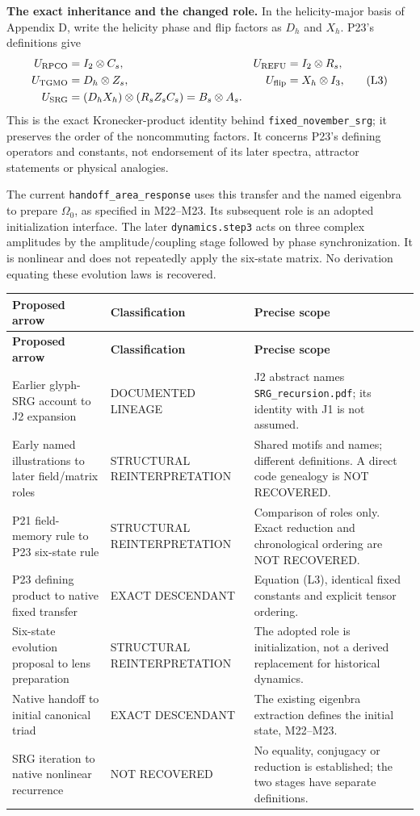 \documentclass[11pt,a4paper]{article}
\begin{document}
\textbf{The exact inheritance and the changed role.}
In the helicity-major basis of Appendix D, write the helicity phase and flip factors as \(D_h\) and \(X_h\). P23's definitions give
\[
\begin{aligned}
 U_{\rm RPCO}&=I_2\otimes C_s,&U_{\rm REFU}&=I_2\otimes R_s,\\
 U_{\rm TGMO}&=D_h\otimes Z_s,&U_{\rm flip}&=X_h\otimes I_3,\\
 U_{\rm SRG}&=(D_hX_h)\otimes(R_sZ_sC_s)=B_s\otimes A_s .
\end{aligned}
\tag{L3}\label{eq:L3}
\]
This is the exact Kronecker-product identity behind \texttt{fixed\_november\_srg}; it preserves the order of the noncommuting factors. It concerns P23's defining operators and constants, not endorsement of its later spectra, attractor statements or physical analogies.

The current \texttt{handoff\_area\_response} uses this transfer and the named eigenbra to prepare \(\Omega_0\), as specified in M22--M23. Its subsequent role is an adopted initialization interface. The later \texttt{dynamics.step3} acts on three complex amplitudes by the amplitude/coupling stage followed by phase synchronization. It is nonlinear and does not repeatedly apply the six-state matrix. No derivation equating these evolution laws is recovered.

\begingroup\small\setlength{\LTpre}{5pt}\setlength{\LTpost}{7pt}
\begin{longtable}{@{}p{}p{}p{}@{}}
\toprule
\textbf{Proposed arrow} & \textbf{Classification} & \textbf{Precise scope}\\ \midrule
\endfirsthead
\textbf{Proposed arrow} & \textbf{Classification} & \textbf{Precise scope}\\ \midrule
\endhead
\bottomrule\endfoot
Earlier glyph-SRG account to J2 expansion & DOCUMENTED LINEAGE & J2 abstract names \texttt{SRG\_recursion.pdf}; its identity with J1 is not assumed.\\[5pt]
Early named illustrations to later field/matrix roles & STRUCTURAL REINTERPRETATION & Shared motifs and names; different definitions. A direct code genealogy is NOT RECOVERED.\\[5pt]
P21 field-memory rule to P23 six-state rule & STRUCTURAL REINTERPRETATION & Comparison of roles only. Exact reduction and chronological ordering are NOT RECOVERED.\\[5pt]
P23 defining product to native fixed transfer & EXACT DESCENDANT & Equation (L3), identical fixed constants and explicit tensor ordering.\\[5pt]
Six-state evolution proposal to lens preparation & STRUCTURAL REINTERPRETATION & The adopted role is initialization, not a derived replacement for historical dynamics.\\[5pt]
Native handoff to initial canonical triad & EXACT DESCENDANT & The existing eigenbra extraction defines the initial state, M22--M23.\\[5pt]
SRG iteration to native nonlinear recurrence & NOT RECOVERED & No equality, conjugacy or reduction is established; the two stages have separate definitions.\\[5pt]
\end{longtable}\endgroup
\end{document}
